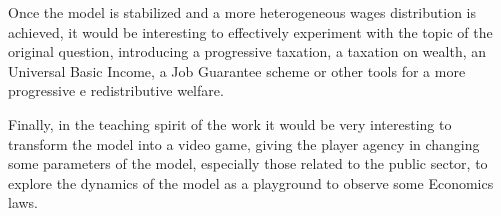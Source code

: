 Once the model is stabilized and a more heterogeneous wages distribution is achieved, it would be interesting to effectively experiment with the topic of the original question, introducing a progressive taxation, a taxation on wealth, an Universal Basic Income, a Job Guarantee scheme or other tools for a more progressive e redistributive welfare.

Finally, in the teaching spirit of the work it would be very interesting to transform the model into a video game, giving the player agency in changing some parameters of the model, especially those related to the public sector, to explore the dynamics of the model as a playground to observe some Economics laws.